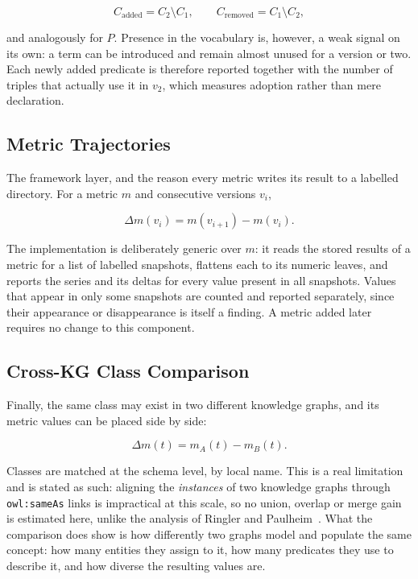 \begin{equation}
  C_{\mathrm{added}} = C_2 \setminus C_1,
  \qquad
  C_{\mathrm{removed}} = C_1 \setminus C_2,
  \label{eq:vocab}
\end{equation}

and analogously for $P$. Presence in the vocabulary is, however, a weak signal on
its own: a term can be introduced and remain almost unused for a version or two.
Each newly added predicate is therefore reported together with the number of
triples that actually use it in $v_2$, which measures adoption rather than mere
declaration.

\subsection{Metric Trajectories}

The framework layer, and the reason every metric writes its result to a labelled
directory. For a metric $m$ and consecutive versions $v_i$,

\begin{equation}
  \Delta m(v_i) = m(v_{i+1}) - m(v_i).
  \label{eq:trajectory}
\end{equation}

The implementation is deliberately generic over $m$: it reads the stored results
of a metric for a list of labelled snapshots, flattens each to its numeric
leaves, and reports the series and its deltas for every value present in all
snapshots. Values that appear in only some snapshots are counted and reported
separately, since their appearance or disappearance is itself a finding. A metric
added later requires no change to this component.

\subsection{Cross-KG Class Comparison}

Finally, the same class may exist in two different knowledge graphs, and its
metric values can be placed side by side:

\begin{equation}
  \Delta m(t) = m_A(t) - m_B(t).
  \label{eq:crosskg}
\end{equation}

Classes are matched at the schema level, by local name. This is a real
limitation and is stated as such: aligning the \emph{instances} of two knowledge
graphs through \texttt{owl:sameAs} links is impractical at this scale, so no
union, overlap or merge gain is estimated here, unlike the analysis of Ringler
and Paulheim~\cite{ringler2017one}. What the comparison does show is how
differently two graphs model and populate the same concept: how many entities
they assign to it, how many predicates they use to describe it, and how diverse
the resulting values are.

